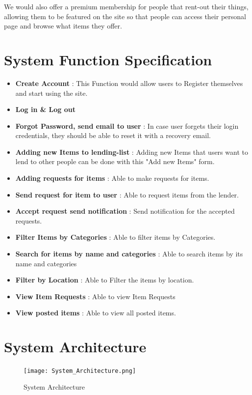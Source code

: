 \documentclass[a4paper]{article}
\begin{document}
We would also offer a premium membership for people that rent-out their things, allowing them to be featured on the site so that people can access their personal page and browse what items they offer. 

\section{System Function Specification}
\begin{itemize}
\item \textbf{Create Account} : This Function would allow users to Register themselves and start using the site.
\item \textbf{Log in \& Log out} 
\item \textbf{Forgot Password, send email to user} : In case user forgets their  login credentials, they should be able to reset it with a recovery email. 
\item \textbf{Adding new Items to lending-list} : Adding new Items that users want to lend to other people can be done with this "Add new Items" form.
\item \textbf{Adding requests for items} : Able to make requests for items.
\item \textbf{Send request for item to user} : Able to request items from the lender.
\item \textbf{Accept request send notification} : Send notification for the accepted requests.
\item \textbf{Filter Items by Categories} : Able to filter items by Categories.
\item \textbf{Search for items by name and categories} : Able to search items by its name and categories 
\item \textbf{Filter by Location} : Able to Filter the items by location.
\item \textbf{View Item Requests} : Able to view Item Requests
\item \textbf{View posted items} : Able to view all posted items.

\end{itemize}

\section{System Architecture }
\begin{figure}[H] 
  \centering
  \texttt{[image: System\_Architecture.png]}\hfill
  \caption{System Architecture}\label{System Architecture}
\end{figure}
\end{document}
